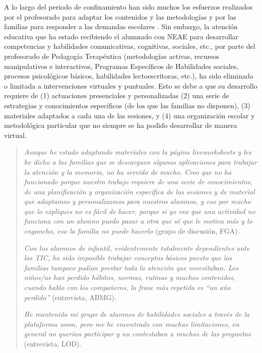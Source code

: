 \documentclass[spanish]{textolivre}
\begin{document}
A lo largo del periodo de confinamiento han sido muchos los esfuerzos realizados por el profesorado para adaptar los contenidos y las metodologías y por las familias para responder a las demandas escolares \cite{rogero2020}. %
Sin embargo, la atención educativa que ha estado recibiendo el alumnado con NEAE para desarrollar competencias y habilidades comunicativas, cognitivas, sociales, etc., por parte del profesorado de Pedagogía Terapéutica (metodologías activas, recursos manipulativos e interactivos, Programas Específicos de Habilidades sociales, procesos psicológicos básicos, habilidades lectoescritoras, etc.), ha sido eliminada o limitada a intervenciones virtuales y puntuales. Esto se debe a que su desarrollo requiere de (1) actuaciones presenciales y personalizadas (2) una serie de estrategias y conocimientos específicos (de los que las familias no disponen), (3) materiales adaptados a cada una de las sesiones, y (4) una organización escolar y metodológica particular que no siempre se ha podido desarrollar de manera virtual.

\begin{quote}
\emph{Aunque he estado adaptando materiales con la página liveworksheets y les he dicho a las familias que se descarguen algunas aplicaciones para trabajar la atención y la memoria, no ha servido de mucho. Creo que no ha funcionado porque nuestro trabajo requiere de una serie de conocimientos, de una planificación y organización específica de las sesiones y de material que adaptamos y personalizamos para nuestros alumnos, y eso por mucho que lo expliques no es fácil de hacer, porque si yo veo que una actividad no funciona con un alumno puedo pasar a otra que sé que le motiva más y lo engancho, eso la familia no puede hacerlo} (grupo de discusión, FGA).

\emph{Con los alumnos de infantil, evidentemente totalmente dependientes ante las TIC, ha sido imposible trabajar conceptos básicos puesto que las familias tampoco podían prestar toda la atención que necesitaban. Los niños/as han perdido hábitos, normas, rutinas y muchos contenidos, cuando hablo con los compañeros, la frase más repetida es “un año perdido”} (entrevista, ABMG).

\emph{He mantenido mi grupo de alumnos de habilidades sociales a través de la plataforma zoom, pero me he encontrado con muchas limitaciones, en general no querían participar y no contestaban a muchas de las preguntas} (entrevista, LOD).
\end{quote}
\end{document}
